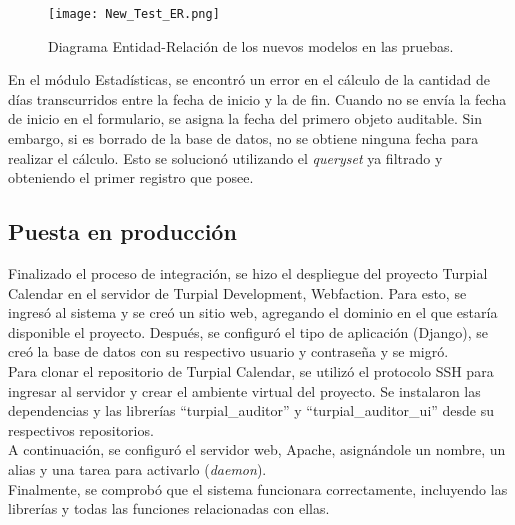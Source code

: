 \begin{figure}[h]
\centering
\texttt{[image: New\_Test\_ER.png]}
\caption{ Diagrama Entidad-Relación de los nuevos modelos en las pruebas.}
\label{fig:figura6.14}
\end{figure}


En el módulo Estadísticas, se encontró un error en el cálculo de la cantidad de días transcurridos entre la fecha de inicio y la de fin. Cuando no se envía la fecha de inicio en el formulario, se asigna la fecha del primero objeto auditable. Sin embargo, si es borrado de la base de datos, no se obtiene ninguna fecha para realizar el cálculo. Esto se solucionó utilizando el \textit{queryset} ya filtrado y obteniendo el primer registro que posee.

\subsection{Puesta en producción}

Finalizado el proceso de integración, se hizo el despliegue del proyecto Turpial Calendar en el servidor de Turpial Development, Webfaction. Para esto, se ingresó al sistema y se creó un sitio web, agregando el dominio en el que estaría disponible el proyecto. Después, se configuró el tipo de aplicación (Django), se creó la base de datos con su respectivo usuario y contraseña y se migró.\\

Para clonar el repositorio de Turpial Calendar, se utilizó el protocolo SSH para ingresar al servidor y crear el ambiente virtual del proyecto. Se instalaron las dependencias y las librerías “turpial\_auditor” y “turpial\_auditor\_ui” desde su respectivos repositorios.\\

A continuación, se configuró el servidor web, Apache, asignándole un nombre, un alias y una tarea para activarlo (\textit{daemon}). \\

Finalmente, se comprobó que el sistema funcionara correctamente, incluyendo las librerías y todas las funciones relacionadas con ellas.
